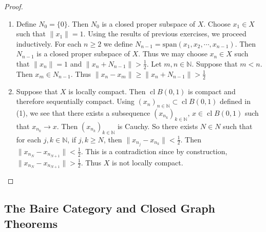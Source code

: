 \documentclass[12pt]{amsart}
\theoremstyle{definition}
\newcommand{\N}{\mathbb{N}}
\newcommand{\conv}[1]{\xrightarrow{#1}}
\DeclareMathOperator{\cl}{cl}
\DeclareMathOperator*{\0}{\mbf{0}}
\DeclareMathOperator*{\1}{\mbf{1}}
\begin{document}
	\begin{proof}\
		\begin{enumerate}
			\item Define $N_0 = \{0\}$. Then $N_0$ is a closed proper subspace of $X$. Choose $x_1 \in X$ such that $\|x_1 \|= 1$. Using the results of previous exercises, we proceed inductively. For each $n \geq 2$ we define $N_{n-1} = \text{span}(x_1, x_2, \cdots, x_{n-1})$. Then $N_{n-1}$ is a closed proper subspace of $X$. Thus we may choose $x_n \in X$ such that $\|x_n \|= 1$ and $\|x_n + N_{n-1} \|>  \frac{1}{2}$. Let $m,n \in \N$. Suppose that $m<n$. Then $x_m \in N_{n-1}$. Thus $\|x_n - x_m \|\geq \|x_n + N_{n-1} \|> \frac{1}{2}$\vspace{.5cm}\\
			\item Suppose that $X$ is locally compact. Then $\cl B(0,1)$ is compact and therefore sequentially compact. Using $(x_n)_{n \in \N} \subset \cl B(0,1)$ defined in (1), we see that there exists a subsequence $(x_{n_k})_{k \in \N}$, $x \in \cl B(0,1)$ such that $x_{n_k} \conv{} x$. Then $(x_{n_k})_{k \in \N}$ is Cauchy. So there exists $N \in N$ such that for each $j, k \in \N$, if $j, k \geq N$, then $\|x_{n_j} - x_{n_k} \|< \frac{1}{2}$. Then $\|x_{n_N} - x_{n_{N+1}} \| < \frac{1}{2}$. This is a contradiction since by construction, $\|x_{n_N} - x_{n_{N+1}} \| > \frac{1}{2}$. Thus $X$ is not locally compact.
		\end{enumerate}
	\end{proof}
	
	
	
	
	
	
	
	
	
	
	
	
	
	
	
	
	
	

	
	
	
	
	
	
	
	
	
	
	
	
	
	
	
	
	
	
	
	
	
	
	
	\newpage
	\subsection{The Baire Category and Closed Graph Theorems}
	
\end{document}
